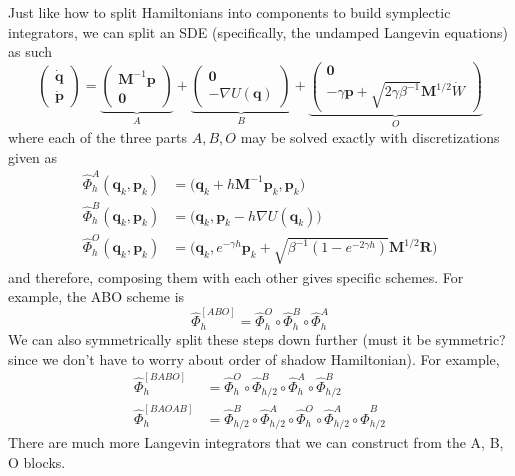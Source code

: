    Just like how to split Hamiltonians into components to build symplectic integrators, we can split an SDE (specifically, the undamped Langevin equations) as such 
    \begin{equation}
      \begin{pmatrix} \mathbf{\dot{q}} \\ \mathbf{\dot{p}} \end{pmatrix} = \underbrace{\begin{pmatrix} \mathbf{M}^{-1} \mathbf{p} \\ \mathbf{0} \end{pmatrix}}_{A} + \underbrace{\begin{pmatrix} \mathbf{0} \\ -\nabla U(\mathbf{q}) \end{pmatrix}}_{B} + \underbrace{\begin{pmatrix} \mathbf{0} \\ -\gamma \mathbf{p} + \sqrt{2 \gamma \beta^{-1}} \mathbf{M}^{1/2} \dot{W} \end{pmatrix}}_{O}
    \end{equation}
    where each of the three parts $A, B, O$ may be solved exactly with discretizations given as 
    \begin{align*}
      \hat{\Phi}_h^A (\mathbf{q}_k, \mathbf{p}_k) & = \big(\mathbf{q}_k + h \mathbf{M}^{-1} \mathbf{p}_k, \mathbf{p}_k \big) \\
      \hat{\Phi}_h^B (\mathbf{q}_k, \mathbf{p}_k) & = \big(\mathbf{q}_k, \mathbf{p}_k - h \nabla U(\mathbf{q}_k) \big) \\
      \hat{\Phi}_h^O (\mathbf{q}_k, \mathbf{p}_k) & = \big(\mathbf{q}_k, e^{-\gamma h} \mathbf{p}_k + \sqrt{\beta^{-1} (1 - e^{-2 \gamma h})} \mathbf{M}^{1/2} \mathbf{R}\big)
    \end{align*}
    and therefore, composing them with each other gives specific schemes. For example, the ABO scheme is 
    \begin{equation}
      \hat{\Phi}_h^{[ABO]} = \hat{\Phi}_h^O \circ \hat{\Phi}_h^B \circ \hat{\Phi}_h^A
    \end{equation}
    We can also symmetrically split these steps down further (must it be symmetric? since we don't have to worry about order of shadow Hamiltonian). For example, 
    \begin{align*}
      \hat{\Phi}_h^{[BABO]} & = \hat{\Phi}_h^O \circ \hat{\Phi}_{h/2}^B \circ \hat{\Phi}_h^A \circ \hat{\Phi}_{h/2}^B \\
      \hat{\Phi}_h^{[BAOAB]} & = \hat{\Phi}_{h/2}^B \circ \hat{\Phi}_{h/2}^A \circ \hat{\Phi}_h^O \circ \hat{\Phi}_{h/2}^A \circ \hat{\Phi}_{h/2}^B
    \end{align*}
    There are much more Langevin integrators that we can construct from the A, B, O blocks. 

